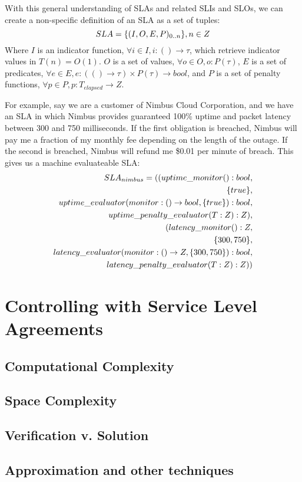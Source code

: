 With this general understanding of SLAs and related SLIs and SLOs, we can create a non-specific definition of an SLA as a set of tuples:
\begin{equation}
SLA = \lbrace (I,O,E,P)_{0..n} \rbrace, n \in Z \\
\end{equation}
Where $ I $ is an indicator function, $ \forall i \in I, i : () \rightarrow \tau $, which retrieve indicator values in $ T(n) = O(1) $.  $ O $ is a set of values, $ \forall o \in O, o : P(\tau) $, $ E $ is a set of predicates, $ \forall e \in E, e : ( () \rightarrow \tau ) \times P(\tau) \rightarrow bool $, and $ P $ is a set of penalty functions, $ \forall p \in P, p : T_{elapsed} \rightarrow Z $.

For example, say we are a customer of Nimbus Cloud Corporation, and we have an SLA in which Nimbus provides guaranteed 100\% uptime and packet latency between 300 and 750 milliseconds.  If the first obligation is breached, Nimbus will pay me a fraction of my monthly fee depending on the length of the outage.  If the second is breached, Nimbus will refund me \$0.01 per minute of breach.  This gives us a machine evaluateable SLA:
\begin{align}
SLA_{nimbus} = ( ( uptime\_monitor() : bool, \\
\lbrace true \rbrace, \notag \\
uptime\_evaluator( monitor : () \rightarrow bool, \lbrace true \rbrace) : bool, \notag \\
uptime\_penalty\_evaluator( T : Z ) : Z ), \notag \\
( latency\_monitor() : Z, \notag \\
\lbrace 300, 750 \rbrace, \notag \\
latency\_evaluator( monitor : () \rightarrow Z, \lbrace 300, 750 \rbrace) : bool, \notag \\
latency\_penalty\_evaluator( T : Z ) : Z) ) \notag
\end{align}

\section{Controlling with Service Level Agreements}

\subsection{Computational Complexity}

\subsection{Space Complexity}

\subsection{Verification v. Solution}

\subsection{Approximation and other techniques}






